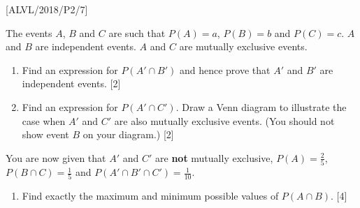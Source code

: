 \item {[}ALVL/2018/P2/7{]}

The events $A$, $B$ and $C$ are such that $P\left(A\right)=a$,
$P\left(B\right)=b$ and $P\left(C\right)=c$. $A$ and $B$ are independent
events. $A$ and $C$ are mutually exclusive events. 
\begin{enumerate}
\item Find an expression for $P\left(A'\cap B'\right)$ and hence prove
that $A'$ and $B'$ are independent events. \hfill{}{[}2{]}
\item Find an expression for $P\left(A'\cap C'\right)$. Draw a Venn diagram
to illustrate the case when $A'$ and $C'$ are also mutually exclusive
events. (You should not show event $B$ on your diagram.) \hfill{}{[}2{]}
\end{enumerate}
You are now given that $A'$ and $C'$ are \textbf{not} mutually exclusive,
$P\left(A\right)=\frac{2}{5}$, $P\left(B\cap C\right)=\frac{1}{5}$
and $P\left(A'\cap B'\cap C'\right)=\frac{1}{10}$. 
\begin{enumerate}
\item Find exactly the maximum and minimum possible values of $P\left(A\cap B\right)$.
\hfill{}{[}4{]}
\end{enumerate}
